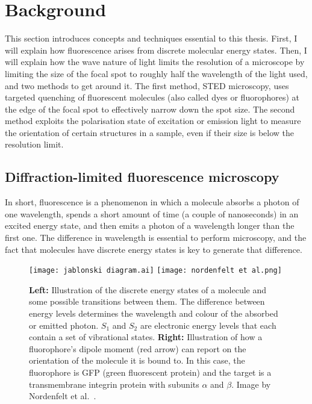 \chapter{Background}

This section introduces concepts and techniques essential to this thesis. First, I will explain how fluorescence arises from discrete molecular energy states. Then, I will explain how the wave nature of light limits the resolution of a microscope by limiting the size of the focal spot to roughly half the wavelength of the light used, and two methods to get around it. The first method, STED microscopy, uses targeted quenching of fluorescent molecules (also called dyes or fluorophores) at the edge of the focal spot to effectively narrow down the spot size. The second method exploits the polarisation state of excitation or emission light to measure the orientation of certain structures in a sample, even if their size is below the resolution limit.

\section{Diffraction-limited fluorescence microscopy}

In short, fluorescence is a phenomenon in which a molecule absorbs a photon of one wavelength, spends a short amount of time (a couple of nanoseconds) in an excited energy state, and then emits a photon of a wavelength longer than the first one. The difference in wavelength is essential to perform microscopy, and the fact that molecules have discrete energy states is key  to generate that difference.

\begin{figure}
	\centering
	 \texttt{[image: jablonski diagram.ai]} \hfill \texttt{[image: nordenfelt et al.png]}
	\caption{
		\textbf{Left:} Illustration of the discrete energy states of a molecule and some possible transitions between them. The difference between energy levels determines the wavelength and colour of the absorbed or emitted photon. $ S_1 $ and $ S_2 $ are electronic energy levels that each contain a set of vibrational states. \textbf{Right:} Illustration of how a fluorophore's dipole moment (red arrow) can report on the orientation of the molecule it is bound to. In this case, the fluorophore is GFP (green fluorescent protein) and the target is a transmembrane integrin protein with subunits $ \alpha $ and $ \beta $. Image by Nordenfelt et al.~\cite{Nordenfelt2017}.
	}
	\label{fig:jablonski}
\end{figure}


